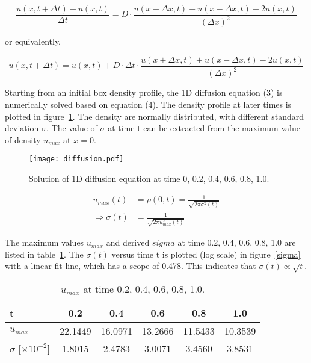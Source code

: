 \documentclass{article}
\begin{document}
\begin{equation*}
\frac{u(x,t+\Delta t) - u(x,t)}{\Delta t} = D \cdot \frac{u(x+\Delta x,t)+u(x-\Delta x,t)-2u(x,t)}{(\Delta x)^2}
\end{equation*}

or equivalently,

\begin{equation}
u(x,t+\Delta t) = u(x,t) + D \cdot \Delta t \cdot \frac{u(x+\Delta x,t)+u(x-\Delta x,t)-2u(x,t)}{(\Delta x)^2}
\end{equation}

Starting from an initial box density profile, the 1D diffusion equation (3) is numerically solved based on equation (4). The density profile at later times is plotted in figure~\ref{diffusion}. The density are normally distributed, with different standard deviation $\sigma$. The value of $\sigma$ at time t can be extracted from the maximum value of density $u_{max}$ at $x=0$.

\begin{figure}[h!]
\centering
\texttt{[image: diffusion.pdf]}
\caption{Solution of 1D diffusion equation at time 0, 0.2, 0.4, 0.6, 0.8, 1.0.}
\label{diffusion}
\end{figure}

\begin{align*}
u_{max} (t) & = \rho(0,t) = \frac{1}{\sqrt{2\pi \sigma^2 (t)}} \\
\Rightarrow \sigma(t) & = \frac{1}{\sqrt{2\pi u_{max}^2 (t)}}
\end{align*}

The maximum values $u_{max}$ and derived $sigma$ at time 0.2, 0.4, 0.6, 0.8, 1.0 are listed in table~\ref{umax}. The $\sigma (t)$ versus time t is plotted (log scale) in figure~\ref{sigma} with a linear fit line, which has a scope of 0.478. This indicates that $\sigma(t) \propto \sqrt{t}$.

\begin{table}[!ht]
\begin{center}
\caption{$u_{max}$ at time 0.2, 0.4, 0.6, 0.8, 1.0.}
\begin{tabular}{ l | c | c | c | c | c }
\hline
t & 0.2 & 0.4 & 0.6 & 0.8 & 1.0 \\ \hline
$u_{max}$ & 22.1449 & 16.0971 & 13.2666 & 11.5433 & 10.3539 \\ \hline
$\sigma$ [$\times 10^{-2}$] & 1.8015 & 2.4783 & 3.0071 & 3.4560 & 3.8531 \\ \hline
\end{tabular}
\end{center}
\label{umax}
\end{table}
\end{document}
